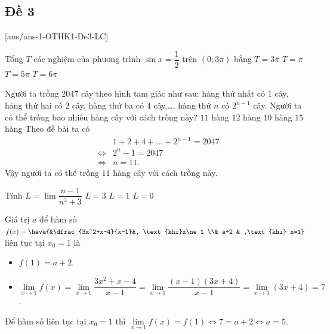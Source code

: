 \subsection{Đề 3}
[ans/ans-1-OTHK1-De3-LC]
\caulc
\begin{ex}%
Tổng $T$ các nghiệm của phương trình $\sin x=\dfrac{1}{2}$ trên $(0;3\pi)$ bằng
	\choice
{$T=3\pi$}
{$T=\pi$}
{$T=5\pi$}
{\True $T=6\pi$}
\end{ex}
\begin{ex}%
	Người ta trồng $2047$ cây theo hình tam giác như sau: hàng thứ nhất có $1$ cây, hàng thứ hai có $2$ cây, hàng thứ ba có $4$ cây,\ldots , hàng thứ $n$ có $2^{n-1}$ cây. Người ta có thể trồng bao nhiêu hàng cây với cách trồng này?
	\choice
	{\True $11$ hàng} 
	{$12$ hàng}
	{$10$ hàng} 
	{$15$ hàng}
	\loigiai
	{
		Theo đề bài ta có
		\begin{eqnarray*}
			&&1+2+4+\ldots +2^{n-1}=2047\\
			&\Leftrightarrow &2^{n}-1=2047\\
			&\Leftrightarrow &n=11.
		\end{eqnarray*}
		Vậy người ta có thể trồng $11$ hàng cây với cách trồng này.
	}
\end{ex}
\begin{ex}%
	Tính 	$L=\displaystyle \lim \dfrac{n-1}{n^3 +3}$ 
	{$L=3 $}
	{$L= 1 $}
	{\True $L= 0 $}
\end{ex}
\begin{ex}%
	Giá trị $ a $ để hàm số $ f(x)=\heva{&\dfrac{3x^2+x-4}{x-1}&, \text{khi}x\ne1 \\& a+2 & ,\text{khi} x=1} $ liên tục tại $ x_0 =1$ là
	\loigiai
	{
		\begin{itemize}
		\item $ f(1)=a+2 $.
		\item $ \lim\limits_{x \to 1} f(x)=\lim\limits_{x\to 1} \dfrac{3x^2+x-4}{x-1} =\lim\limits_{x \to 1}\dfrac{(x-1)(3x+4)}{x-1}=\lim\limits_{x\to 1}(3x+4)=7$.
	\end{itemize}
		Để hàm số liên tục tại $ x_0=1 $ thì $ \lim\limits_{x\to 1}f(x) =f(1)\Leftrightarrow 7=a+2 \Leftrightarrow a=5$.
		
	}
\end{ex}
